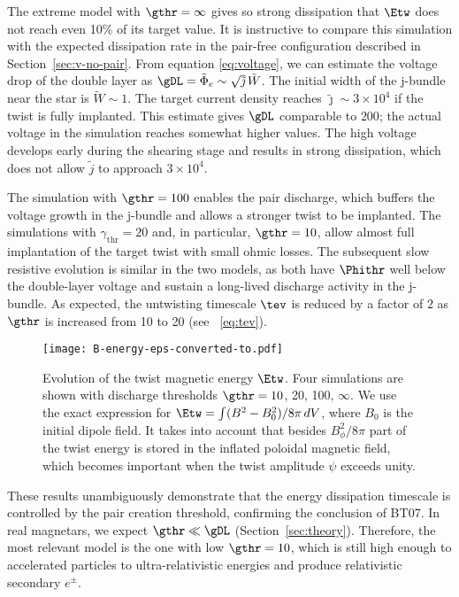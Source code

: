 The extreme model with $\gthr=\infty$ gives so strong dissipation that $\Etw$
does not reach even 10\% of its target value. It is instructive to compare this
simulation with the expected dissipation rate in the pair-free configuration
described in Section~\ref{sec:v-no-pair}. From equation \eqref{eq:voltage}, we
can estimate the voltage drop of the double layer as $\gDL=\tilde{\Phi}_{e} \sim
\sqrt{\tilde{\jmath}}\,\tilde{W}$. The initial width of the j-bundle near the
star is $\tilde{W}\sim 1$. The target current density reaches $\tilde{\jmath}
\sim 3\times 10^4$ if the twist is fully implanted. This estimate gives $\gDL$
comparable to $200$; the actual voltage in the simulation reaches somewhat
higher values. The high voltage develops early during the shearing stage and
results in strong dissipation, which does not allow $\tilde{j}$ to approach
$3\times 10^4$.

The simulation with $\gthr=100$ enables the pair discharge, which buffers the
voltage growth in the j-bundle and allows a stronger twist to be implanted.
The simulations with $\gamma_\mathrm{thr}=20$ and, in particular, $\gthr=10$,
allow almost full implantation of the target twist with small ohmic losses. The subsequent  slow resistive evolution is similar in the two models, as both have $\Phithr$ well below
the double-layer voltage and sustain a long-lived discharge activity in the j-bundle.
As expected, the untwisting timescale $\tev$ is reduced by a factor of $2$ as
$\gthr$ is increased from 10 to 20 (see \Eq~\ref{eq:tev}).


\begin{figure}[t]
  \centering
  \texttt{[image: B-energy-eps-converted-to.pdf]}
  \caption{Evolution of the twist magnetic energy $\Etw$.
     Four simulations are shown with discharge thresholds
    $\gthr=10$, 20, 100, $\infty$. We use the exact expression for
    $\Etw = \int (B^2 - B_0^2)/8\pi\, dV$,
    where $B_0$ is the initial dipole field. It takes into account that besides $B_\phi^2/8\pi$
    part of the twist energy is stored in the inflated poloidal magnetic field, which
    becomes important when the twist amplitude $\psi$ exceeds unity.
  }
  \label{fig:b-energy}
\end{figure}

These results unambiguously demonstrate that the energy dissipation timescale is
controlled by the pair creation threshold, confirming the conclusion of BT07.
In real magnetars, we expect $\gthr\ll\gDL$ (Section~\ref{sec:theory}).
Therefore, the most relevant model is the one with low $\gthr=10$, which is still high
enough to accelerated particles to ultra-relativistic energies and produce relativistic
secondary $e^\pm$.

